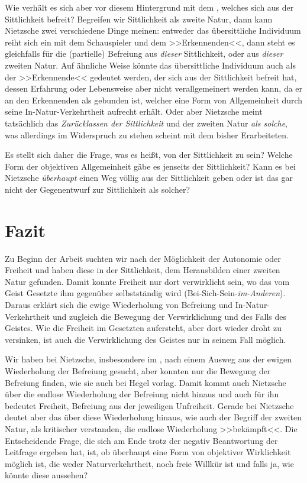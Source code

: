 \documentclass[12pt, a4paper, openany]{report}
\begin{document}
Wie verhält es sich aber vor diesem Hintergrund mit dem , welches sich aus der Sittlichkeit befreit? 
Begreifen wir Sittlichkeit als zweite Natur, dann kann Nietzsche zwei verschiedene Dinge meinen: 
entweder das übersittliche Individuum reiht sich ein mit dem Schauspieler und dem >>Erkennenden<<, dann steht es gleichfalls für die (partielle) Befreiung aus \emph{dieser} Sittlichkeit, oder aus \emph{dieser} zweiten Natur. 
Auf ähnliche Weise könnte das übersittliche Individuum auch als der >>Erkennende<< gedeutet werden, der sich aus der Sittlichkeit befreit hat, dessen Erfahrung oder Lebensweise aber nicht verallgemeinert werden kann, da er an den Erkennenden als  gebunden ist, welcher eine Form von Allgemeinheit durch seine In-Natur-Verkehrtheit aufrecht erhält.
Oder aber Nietzsche meint tatsächlich das \emph{Zurücklassen der Sittlichkeit} und der zweiten Natur \emph{als solche}, was allerdings im Widerspruch zu stehen scheint mit dem bisher Erarbeiteten.

Es stellt sich daher die Frage, was es heißt, von der Sittlichkeit  zu sein? 
Welche Form der objektiven Allgemeinheit gäbe es jenseits der Sittlichkeit?
Kann es bei Nietzsche \emph{überhaupt} einen Weg völlig aus der Sittlichkeit geben oder ist das  gar nicht der Gegenentwurf zur Sittlichkeit als solcher? 


\chapter{Fazit}
Zu Beginn der Arbeit suchten wir nach der Möglichkeit der Autonomie oder Freiheit und haben diese in der Sittlichkeit, dem Herausbilden einer zweiten Natur gefunden.
Damit konnte Freiheit nur dort verwirklicht sein, wo das vom Geist Gesetzte ihm gegenüber selbstständig wird (Bei-Sich-Sein-\emph{im-Anderen}).
Daraus erklärt sich die ewige Wiederholung von Befreiung und In-Natur-Verkehrtheit und zugleich die Bewegung der Verwirklichung und des Falls des Geistes. 
Wie die Freiheit im Gesetzten aufersteht, aber dort wieder droht zu versinken, ist auch die Verwirklichung des Geistes nur in seinem Fall möglich.

Wir haben bei Nietzsche, insbesondere im , nach einem Ausweg aus der ewigen Wiederholung der Befreiung gesucht, aber konnten nur die Bewegung der Befreiung finden, wie sie auch bei Hegel vorlag. 
Damit kommt auch Nietzsche über die endlose Wiederholung der Befreiung nicht hinaus und auch für ihn bedeutet Freiheit, Befreiung aus der jeweiligen Unfreiheit. 
Gerade bei Nietzsche deutet aber das  über diese Wiederholung hinaus, wie auch der Begriff der zweiten Natur, als kritischer verstanden, die endlose Wiederholung >>bekämpft<<. 
Die Entscheidende Frage, die sich am Ende trotz der negativ Beantwortung der Leitfrage ergeben hat, ist, ob überhaupt eine Form von objektiver Wirklichkeit möglich ist, die weder Naturverkehrtheit, noch freie Willkür ist und falls ja, wie könnte diese aussehen?
\end{document}
